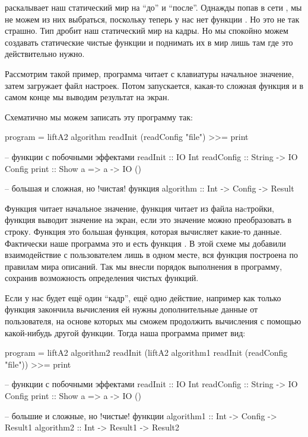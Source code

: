 раскалывает наш статический мир на ``до'' и ``после''. Однажды попав в
сети , мы не можем из них выбраться, поскольку теперь у нас нет
функции . Но это не так страшно. Тип  дробит наш
статический мир на кадры. Но мы спокойно можем создавать статические
чистые функции и поднимать их в мир  лишь там где это
действительно нужно.

Рассмотрим такой пример, программа читает с клавиатуры начальное
значение, затем загружает файл настроек. Потом запускается, какая-то
сложная функция и в самом конце мы выводим результат на экран.

Схематично мы можем записать эту программу так:


\begin{code}
program = liftA2 algorithm readInit (readConfig "file") >>= print

-- функции с побочными эффектами
readInit   :: IO Int
readConfig :: String -> IO Config
print      :: Show a => a -> IO ()

-- большая и сложная, но !чистая! функция
algorithm  :: Int -> Config -> Result
\end{code}

Функция  читает начальное значение, функция 
читает из файла наcтройки, функция  выводит значение на экран,
если это значение можно преобразовать в строку. Функция 
это большая функция, которая вычисляет какие-то данные. Фактически наше
программа это и есть функция . В этой схеме мы добавили
взаимодействие с пользователем лишь в одном месте, вся функция
 построена по правилам мира описаний. Так мы внесли
порядок выполнения в программу, сохранив возможность определения чистых
функций.

Если у нас будет ещё один ``кадр'', ещё одно действие, например как
только функция  закончила вычисления ей нужны
дополнительные данные от пользователя, на основе которых мы сможем
продолжить вычисления с помощью какой-нибудь другой функции. Тогда наша
программа примет вид:


\begin{code}
program = 
    liftA2 algorithm2 readInit 
        (liftA2 algorithm1 readInit (readConfig "file"))
    >>= print

-- функции с побочными эффектами
readInit   :: IO Int
readConfig :: String -> IO Config
print      :: Show a => a -> IO ()

-- большие и сложные, но !чистые! функции
algorithm1  :: Int -> Config -> Result1
algorithm2  :: Int -> Result1 -> Result2
\end{code}

